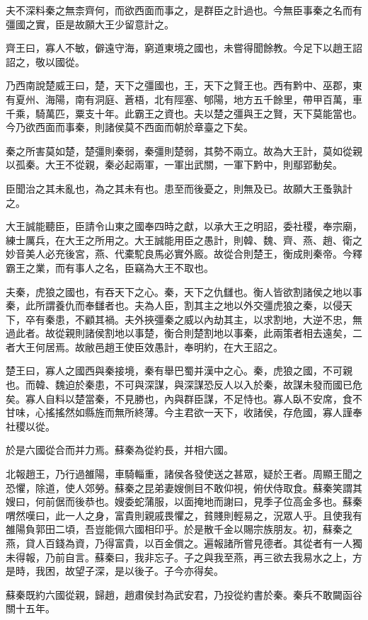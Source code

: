 夫不深料秦之無柰齊何，而欲西面而事之，是群臣之計過也。今無臣事秦之名而有彊國之實，臣是故願大王少留意計之。

齊王曰，寡人不敏，僻遠守海，窮道東境之國也，未嘗得聞餘教。今足下以趙王詔詔之，敬以國從。

乃西南說楚威王曰，楚，天下之彊國也，王，天下之賢王也。西有黔中、巫郡，東有夏州、海陽，南有洞庭、蒼梧，北有陘塞、郇陽，地方五千餘里，帶甲百萬，車千乘，騎萬匹，粟支十年。此霸王之資也。夫以楚之彊與王之賢，天下莫能當也。今乃欲西面而事秦，則諸侯莫不西面而朝於章臺之下矣。

秦之所害莫如楚，楚彊則秦弱，秦彊則楚弱，其勢不兩立。故為大王計，莫如從親以孤秦。大王不從親，秦必起兩軍，一軍出武關，一軍下黔中，則鄢郢動矣。

臣聞治之其未亂也，為之其未有也。患至而後憂之，則無及已。故願大王蚤孰計之。

大王誠能聽臣，臣請令山東之國奉四時之獻，以承大王之明詔，委社稷，奉宗廟，練士厲兵，在大王之所用之。大王誠能用臣之愚計，則韓、魏、齊、燕、趙、衛之妙音美人必充後宮，燕、代橐駝良馬必實外廄。故從合則楚王，衡成則秦帝。今釋霸王之業，而有事人之名，臣竊為大王不取也。

夫秦，虎狼之國也，有吞天下之心。秦，天下之仇讎也。衡人皆欲割諸侯之地以事秦，此所謂養仇而奉讎者也。夫為人臣，割其主之地以外交彊虎狼之秦，以侵天下，卒有秦患，不顧其禍。夫外挾彊秦之威以內劫其主，以求割地，大逆不忠，無過此者。故從親則諸侯割地以事楚，衡合則楚割地以事秦，此兩策者相去遠矣，二者大王何居焉。故敝邑趙王使臣效愚計，奉明約，在大王詔之。

楚王曰，寡人之國西與秦接境，秦有舉巴蜀并漢中之心。秦，虎狼之國，不可親也。而韓、魏迫於秦患，不可與深謀，與深謀恐反人以入於秦，故謀未發而國已危矣。寡人自料以楚當秦，不見勝也，內與群臣謀，不足恃也。寡人臥不安席，食不甘味，心搖搖然如縣旌而無所終薄。今主君欲一天下，收諸侯，存危國，寡人謹奉社稷以從。

於是六國從合而并力焉。蘇秦為從約長，并相六國。

北報趙王，乃行過雒陽，車騎輜重，諸侯各發使送之甚眾，疑於王者。周顯王聞之恐懼，除道，使人郊勞。蘇秦之昆弟妻嫂側目不敢仰視，俯伏侍取食。蘇秦笑謂其嫂曰，何前倨而後恭也。嫂委蛇蒲服，以面掩地而謝曰，見季子位高金多也。蘇秦喟然嘆曰，此一人之身，富貴則親戚畏懼之，貧賤則輕易之，況眾人乎。且使我有雒陽負郭田二頃，吾豈能佩六國相印乎。於是散千金以賜宗族朋友。初，蘇秦之燕，貸人百錢為資，乃得富貴，以百金償之。遍報諸所嘗見德者。其從者有一人獨未得報，乃前自言。蘇秦曰，我非忘子。子之與我至燕，再三欲去我易水之上，方是時，我困，故望子深，是以後子。子今亦得矣。

蘇秦既約六國從親，歸趙，趙肅侯封為武安君，乃投從約書於秦。秦兵不敢闚函谷關十五年。

